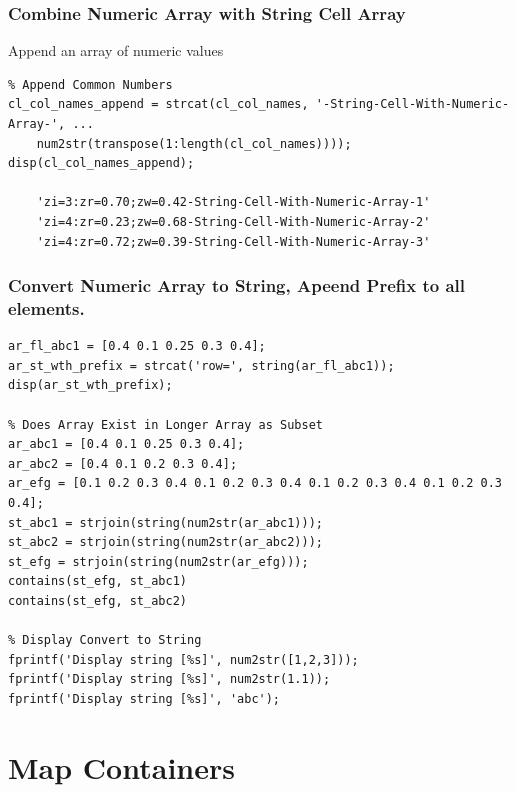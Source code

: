 \documentclass[
]{book}
\begin{document}
\hypertarget{combine-numeric-array-with-string-cell-array}{%
\subsubsection{Combine Numeric Array with String Cell Array}\label{combine-numeric-array-with-string-cell-array}}

Append an array of numeric values

\begin{verbatim}
% Append Common Numbers
cl_col_names_append = strcat(cl_col_names, '-String-Cell-With-Numeric-Array-', ...
    num2str(transpose(1:length(cl_col_names))));
disp(cl_col_names_append);

    'zi=3:zr=0.70;zw=0.42-String-Cell-With-Numeric-Array-1'
    'zi=4:zr=0.23;zw=0.68-String-Cell-With-Numeric-Array-2'
    'zi=4:zr=0.72;zw=0.39-String-Cell-With-Numeric-Array-3'
\end{verbatim}

\hypertarget{convert-numeric-array-to-string-apeend-prefix-to-all-elements.}{%
\subsubsection{Convert Numeric Array to String, Apeend Prefix to all elements.}\label{convert-numeric-array-to-string-apeend-prefix-to-all-elements.}}

\begin{verbatim}
ar_fl_abc1 = [0.4 0.1 0.25 0.3 0.4];
ar_st_wth_prefix = strcat('row=', string(ar_fl_abc1));
disp(ar_st_wth_prefix);

% Does Array Exist in Longer Array as Subset
ar_abc1 = [0.4 0.1 0.25 0.3 0.4];
ar_abc2 = [0.4 0.1 0.2 0.3 0.4];
ar_efg = [0.1 0.2 0.3 0.4 0.1 0.2 0.3 0.4 0.1 0.2 0.3 0.4 0.1 0.2 0.3 0.4];
st_abc1 = strjoin(string(num2str(ar_abc1)));
st_abc2 = strjoin(string(num2str(ar_abc2)));
st_efg = strjoin(string(num2str(ar_efg)));
contains(st_efg, st_abc1)
contains(st_efg, st_abc2)

% Display Convert to String
fprintf('Display string [%s]', num2str([1,2,3]));
fprintf('Display string [%s]', num2str(1.1));
fprintf('Display string [%s]', 'abc');
\end{verbatim}

\hypertarget{map-containers}{%
\section{Map Containers}\label{map-containers}}
\end{document}
